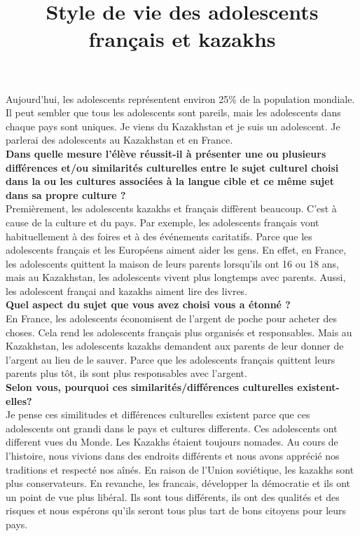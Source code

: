 \documentclass[a4paper, 12pt]{article}
\title{Style de vie des adolescents français et kazakhs}
\author{}
\date{}
\begin{document}
\maketitle
{}
Aujourd'hui, les adolescents représentent environ 25\% \cite{teenagers} de la population mondiale. Il peut sembler que tous les adolescents sont pareils, mais les adolescents dans chaque pays sont uniques. Je viens du Kazakhstan et je suis un adolescent. Je parlerai des adolescents au Kazakhstan et en France. \\

\textbf{Dans quelle mesure l’élève réussit-il à présenter une ou plusieurs différences et/ou similarités
  culturelles entre le sujet culturel choisi dans la ou les cultures associées à la langue cible et ce
même sujet dans sa propre culture ?}\\

Premièrement, les adolescents kazakhs et français diffèrent beaucoup. C'est à cause de la culture et du pays. Par exemple, les adolescents français vont habituellement à des foires et à des événements caritatifs. Parce que les adolescents français et les Européens aiment aider les gens. En effet, en France, les adolescents quittent la maison de leurs parents lorsqu'ils ont 16 ou 18 ans, mais au Kazakhstan, les adolescents vivent plus longtemps avec parents. Aussi, les adolescent françai and kazakhs aiment lire des livres. \cite{hobbies} \\

\textbf{Quel aspect du sujet que vous
avez choisi vous a étonné ?}\\

En France, les adolescents économisent de l'argent de poche pour acheter des choses. Cela rend les adolescents français plus organisés et responsables. Mais au Kazakhstan, les adolescents kazakhs demandent aux parents de leur donner de l'argent au lieu de le sauver. Parce que les adolescents français quittent leurs parents plus tôt, ils sont plus responsables avec l'argent.\\

\textbf{Selon vous, pourquoi ces similarités/différences culturelles existent-elles?}\\

Je pense ces similitudes et différences culturelles existent parce que ces adolescents ont grandi dans le pays et cultures differents. Ces adolescents ont different vues du Monde. Les Kazakhs étaient toujours nomades. Au cours de l'histoire, nous vivions dans des endroits différents et nous avons apprécié nos traditions et respecté nos aînés. En raison de l'Union soviétique, les kazakhs sont plus conservateurs.
En revanche, les francais, développer la démocratie et ils ont un point de vue plus libéral. Ils sont tous différents, ils ont des qualités et des risques et nous espérons qu’ils seront tous plus tart de bons citoyens pour leurs pays.



\end{document}
